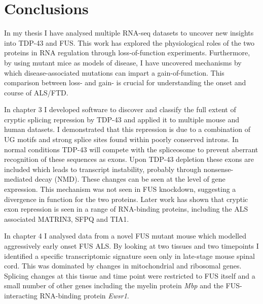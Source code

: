 \chapter{Conclusions}



In my thesis I have analysed multiple RNA-seq datasets to uncover new insights into TDP-43 and FUS.
This work has explored the physiological roles of the two proteins in RNA regulation through loss-of-function experiments.
Furthermore, by using mutant mice as models of disease, I have uncovered mechanisms by which disease-associated mutations can impart a gain-of-function. 
This comparison between loss- and gain- is crucial for understanding the onset and course of ALS/FTD.

In chapter 3 I developed software to discover and classify the full extent of cryptic splicing repression by TDP-43 and applied it to multiple mouse and human datasets.
I demonstrated that this repression is due to a combination of UG motifs and strong splice sites found within poorly conserved introns.
In normal conditions TDP-43 will compete with the spliceosome to prevent aberrant recognition of these sequences as exons.
Upon TDP-43 depletion these exons are included which leads to transcript instability, probably through nonsense-mediated decay (NMD).
These changes can be seen at the level of gene expression.
This mechanism was not seen in FUS knockdown, suggesting a divergence in function for the two proteins.
Later work has shown that cryptic exon repression is seen in a range of RNA-binding proteins, including the ALS associated MATRIN3, SFPQ and TIA1.

In chapter 4 I analysed data from a novel FUS mutant mouse which modelled aggressively early onset FUS ALS. 
By looking at two tissues and two timepoints I identified a specific transcriptomic signature seen only in late-stage mouse spinal cord.
This was dominated by changes in mitochondrial and ribosomal genes.
Splicing changes at this tissue and time point were restricted to FUS itself and a small number of other genes including the myelin protein \textit{Mbp} and the FUS-interacting RNA-binding protein \textit{Ewsr1}.

